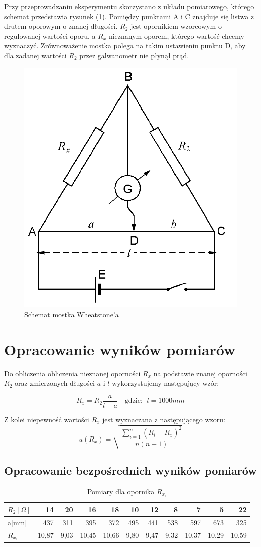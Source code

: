 \documentclass [a4paper,11pt]{article}
\begin{document}
Przy przeprowadzaniu eksperymentu skorzystano z układu pomiarowego, którego schemat przedstawia rysunek (\ref{fig:schemat}). Pomiędzy punktami A i C znajduje się listwa z  drutem oporowym o znanej długości. $R_2$ jest opornikiem wzorcowym o regulowanej wartości oporu, a $R_x$ nieznanym oporem, którego wartość chcemy wyznaczyć. Zrównoważenie mostka polega na takim ustawieniu punktu D, aby dla zadanej wartości $R_2$ przez galwanometr nie płynął prąd.
\begin{figure} [H]
\centering
\includegraphics[width=0.4\linewidth]{./schemat}
\caption{Schemat mostka Wheatstone'a}
\label{fig:schemat}
\end{figure}


\section{Opracowanie wyników pomiarów}
Do obliczenia obliczenia nieznanej oporności $R_x$ na podstawie znanej oporności $R_2$ oraz zmierzonych długości $a$ i $l$  wykorzystujemy następujący wzór:

\begin{equation}
R_x = R_2 \frac{a}{l-a} \quad \text{gdzie: } \; l=1000mm
\label{eq:R_x} 
\end{equation}

Z kolei niepewność wartości $R_x$ jest wyznaczana z następującego wzoru:
\begin{equation}
u(R_x) = \sqrt{\frac{\sum_{i=1}^{n} \left( R_i - \overline{R_x} \right)^2 }{n(n-1)}}
\label{eq:R_x_delta} 
\end{equation}



\subsection{Opracowanie bezpośrednich wyników pomiarów}
\begin{table}[H]
\centering
\begin{tabular}{|l|r|r|r|r|r|r|r|r|r|r|}
\hline
$R_2[\Omega]$  & 14    & 20   & 16    & 18    & 10   & 12   & 8    & 7     & 5     & 22    \\
\hline
a[mm]  & 437   & 311  & 395   & 372   & 495  & 441  & 538  & 597   & 673   & 325   \\
\hline
$R_{x_1}$ & 10,87 & 9,03 & 10,45 & 10,66 & 9,80 & 9,47 & 9,32 & 10,37 & 10,29 & 10,59\\
\hline                      
\end{tabular}
\caption{Pomiary dla opornika $R_{x_1}$}
\label{tab:Rx1}
\end{table}
\end{document}
